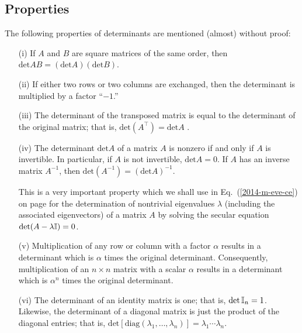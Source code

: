 \subsection{Properties}

The following properties of determinants are mentioned (almost) without proof:

\begin{itemize}
\item[(i)]
If $A$ and $B$ are square matrices of the same order, then
$\textrm{det}AB = (\textrm{det}A)  (\textrm{det}B)$.

\item[(ii)]
If either two rows or two columns are exchanged, then the determinant is multiplied
by a factor ``$-1$.''


\item[(iii)]
The determinant of the transposed matrix is equal to the determinant of the original matrix; that is,
$\textrm{det}(A^\intercal ) = \textrm{det}A $ .

\item[(iv)]
The determinant $\textrm{det}A $ of a matrix $A$ is nonzero if and only if $A$ is invertible.
In particular, if $A$ is not invertible, $\textrm{det}A =0$.
If $A$ has an inverse matrix $A^{-1}$, then $\textrm{det}(A^{-1}) = (\textrm{det}A)^{-1} $.

This is a very important property which we shall use in Eq.~(\ref{2014-m-eve-ce}) on page \pageref{2014-m-eve-ce}
for the determination of nontrivial
eigenvalues $\lambda$ (including the associated eigenvectors)
of a matrix $A$ by solving the secular equation $\textrm{det} (A-\lambda {\Bbb I})=0 $.



\item[(v)]
Multiplication of any row or column with a factor $\alpha$  results in a determinant
which is $\alpha$ times the original determinant.
Consequently,
multiplication of an $n \times n$ matrix with a scalar $\alpha$ results
in a   determinant
which is $\alpha^n$ times the original determinant.

\item[(vi)]
The determinant of an identity matrix is one; that is,
$\textrm{det} \, {\Bbb I}_n =1$.
Likewise, the determinant of a diagonal matrix is just the product of the diagonal entries;
that is,
$\textrm{det} [\textrm{diag}(\lambda_1,\ldots, \lambda_n)] = \lambda_1 \cdots \lambda_n$.


\end{itemize}
